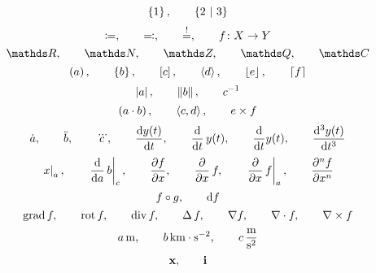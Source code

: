 \documentclass[a4paper,fleqn, 11pt]{article}
\begin{document}
  \[
    \set{1}{}
    \separate
    \set{2}{3}
  \]
  \[
    \coloneqq
    ,\qquad
    \eqqcolon
    ,\qquad
    \stackrel{!}{=}
    ,\qquad
    f\colon X\to Y
  \]
  \[
    \setReal
    \separate
    \setNatural
    \separate
    \setInteger
    \separate
    \setRational
    \separate
    \setComplex
  \]
  \[
    \left( a \right)
    ,\qquad
    \left\{ b \right\}
    ,\qquad
    \left[ c \right]
    ,\qquad
    \left\langle d \right\rangle
    ,\qquad
    \left\lfloor e \right\rfloor
    ,\qquad
    \left\lceil f \right\rceil
  \]
  \[
    \left| a \right|
    ,\qquad
    \left\| b \right\|
    ,\qquad
    {c}^{-1}
  \]
  \[
    \left( a\cdot b \right)
    ,\qquad
    \left\langle c,d \right\rangle
    ,\qquad
    e \times f
  \]
  \[
    \timeDerivative{a}
    \separate
    \timeSecondDerivative{b}
    \separate
    \timeThirdDerivative{c}
    \separate
    \leibnizDerivative{y(t)}{t}
    \separate
    \leibnizDerivativeOperator{t}{y(t)}
    \separate
    \leibnizDerivativeOperator{t}{}y(t)
    \separate
    \leibnizDerivative[3]{y(t)}{t}
  \]
  \[
    \appendValue{x}{a}
    \separate
    \leibnizDerivativeOperatorValue{a}{b}{c}
    \separate
    \leibnizPartialDerivative{f}{x}
    \separate
    \leibnizPartialDerivativeOperator{x}{f}
    \separate
    \leibnizPartialDerivativeOperatorValue{x}{f}{a}
    \separate
    \leibnizPartialDerivative[n]{f}{x}
  \]
  \[
    f\circ g
    ,\qquad
    \mathrm{d} f
  \]
  \[
      \operatorname{grad} f
      ,\qquad
      \operatorname{rot} f
      ,\qquad
      \operatorname{div} f
      ,\qquad
      \operatorname{\Delta} f
      ,\qquad
      \nabla f
      ,\qquad
      \nabla\cdot f
      ,\qquad
      \nabla\times f
  \]
  \[
    a\, \mathrm{m}
    ,\qquad
    b\, \mathrm{km\cdot s^{-2}}
    ,\qquad
    c\, \mathrm{\frac{m}{s^2}}
  \]
  \begin{equation}
 	\mathbf{x}
  	,\qquad
  	\mathbf{i}
  \end{equation}
\end{document}
